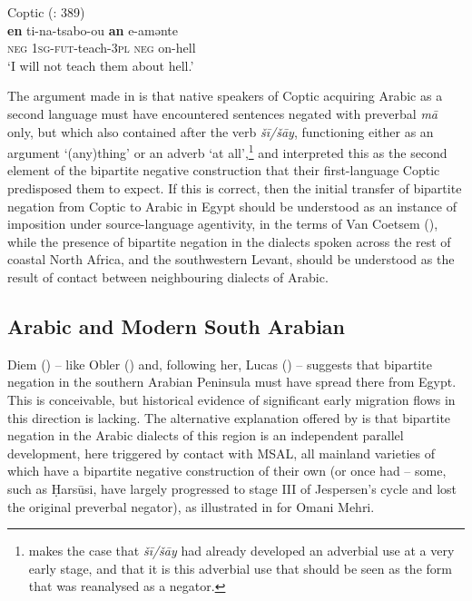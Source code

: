 \documentclass[output=paper]{langsci/langscibook}
\begin{document}
\ea\label{coptic}
{       Coptic (\citealt{LucasLash2010}: 389)}\\
\gll \textbf{en} ti-na-tsabo-ou \textbf{an} e-amənte\\
     \textsc{neg} \textsc{1sg-fut-}teach-\textsc{3pl} \textsc{neg} on-hell\\
\glt ‘I will not teach them about hell.’
\z

The argument made in \citet{LucasLash2010} is that native speakers of Coptic acquiring Arabic as a second language must have encountered sentences negated with preverbal \textit{mā} only, but which also contained after the verb \textit{šī/šāy}, functioning either as an argument ‘(any)thing’ or an adverb ‘at all’,\footnote{\citet{Diem2014} makes the case that \textit{šī/šāy} had already developed an adverbial use at a very early stage, and that it is this adverbial use that should be seen as the form that was reanalysed as a negator.} and interpreted this as the second element of the bipartite negative construction that their first-language Coptic predisposed them to expect. If this is correct, then the initial transfer of bipartite negation from Coptic to Arabic in Egypt should be understood as an instance of imposition under source-language agentivity, in the terms of Van Coetsem (\citeyear{VanCoetsem1988,VanCoetsem2000}), while the presence of bipartite negation in the dialects spoken across the rest of coastal North Africa, and the southwestern Levant, should be understood as the result of contact between neighbouring dialects of Arabic.



\subsection{Arabic and Modern South Arabian}


Diem (\citeyear[73]{Diem2014}) -- like Obler (\citeyear[148]{Obler1990}) and, following her, Lucas (\citeyear[416]{Lucas2007}) -- suggests that bipartite negation in the southern Arabian Peninsula must have spread there from Egypt. This is conceivable, but historical evidence of significant early migration flows in this direction is lacking. The alternative explanation offered by \citet{LucasLash2010} is that bipartite negation in the Arabic dialects of this region is an independent parallel development, here triggered by contact with MSAL, all mainland varieties of which have a bipartite negative construction of their own (or once had – some, such as Ḥarsūsi, have largely progressed to stage III of Jespersen’s cycle and lost the original preverbal negator), as illustrated in  for Omani Mehri.
\end{document}
